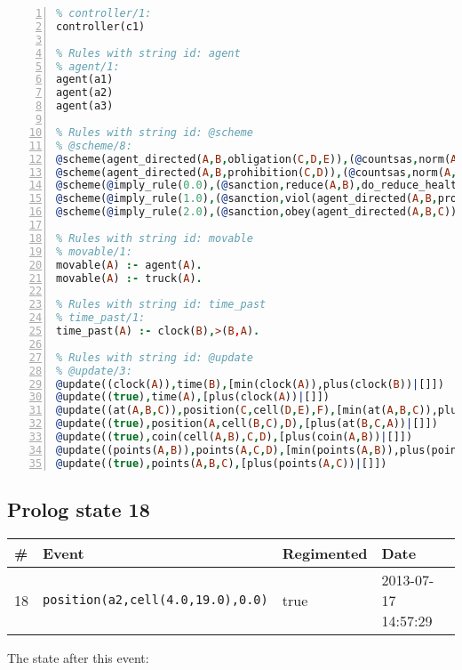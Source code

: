 \documentclass[11pt]{article}\usepackage[utf8]{inputenc}\usepackage{geometry}
\begin{document}
\begin{lstlisting}[language=Prolog, numbers=left]
% Rules with string id: controller
% controller/1:
controller(c1)

% Rules with string id: agent
% agent/1:
agent(a1)
agent(a2)
agent(a3)

% Rules with string id: @scheme
% @scheme/8:
@scheme(agent_directed(A,B,obligation(C,D,E)),(@countsas,norm(A,B,F,obligation(C,D,E)),F),false,(listTrue(C)),(time_past(D)),false,[plus(viol(agent_directed(A,B,obligation(C,D,E))))|[]],[plus(obey(agent_directed(A,B,obligation(C,D,E))))|[]])
@scheme(agent_directed(A,B,prohibition(C,D)),(@countsas,norm(A,B,E,prohibition(C,D)),E),(listTrue(C)),false,(false),false,[plus(viol(agent_directed(A,B,prohibition(C,D))))|[]],[plus(obey(agent_directed(A,B,prohibition(C,D))))|[]])
@scheme(@imply_rule(0.0),(@sanction,reduce(A,B),do_reduce_health(A,B),notifyAgent(A,changed(status))),true,false,false,false,[min(reduce(A,B))|[]],[])
@scheme(@imply_rule(1.0),(@sanction,viol(agent_directed(A,B,prohibition(C,D))),do_sanction(D)),true,false,false,false,[min(viol(agent_directed(A,B,prohibition(C,D))))|[]],[])
@scheme(@imply_rule(2.0),(@sanction,obey(agent_directed(A,B,C))),true,false,false,false,[min(obey(agent_directed(A,B,C)))|[]],[])

% Rules with string id: movable
% movable/1:
movable(A) :- agent(A).
movable(A) :- truck(A).

% Rules with string id: time_past
% time_past/1:
time_past(A) :- clock(B),>(B,A).

% Rules with string id: @update
% @update/3:
@update((clock(A)),time(B),[min(clock(A)),plus(clock(B))|[]])
@update((true),time(A),[plus(clock(A))|[]])
@update((at(A,B,C)),position(C,cell(D,E),F),[min(at(A,B,C)),plus(at(D,E,C))|[]])
@update((true),position(A,cell(B,C),D),[plus(at(B,C,A))|[]])
@update((true),coin(cell(A,B),C,D),[plus(coin(A,B))|[]])
@update((points(A,B)),points(A,C,D),[min(points(A,B)),plus(points(A,D))|[]])
@update((true),points(A,B,C),[plus(points(A,C))|[]])

\end{lstlisting}
\clearpage 
\subsection{Prolog state 18}
\begin{table}[ht]
\centering 
\begin{tabular}{l l l l} 
\textbf{\#} & \textbf{Event} & \textbf{Regimented} & \textbf{Date} \\ [0.5ex] 
\hline
18&\texttt{position(a2,cell(4.0,19.0),0.0)}&true&2013-07-17 14:57:29\\ [1ex] \hline\end{tabular}
\end{table}
The state after this event:
\end{document}

